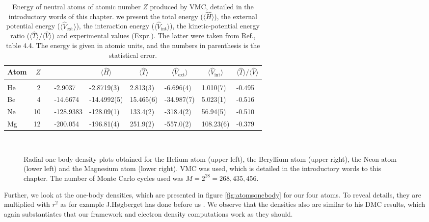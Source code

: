 \begin{table}
	\caption{Energy of neutral atoms of atomic number $Z$ produced by VMC, detailed in the introductory words of this chapter. we present the total energy ($\langle\hat{H}\rangle$), the external potential energy ($\langle\hat{V}_{\text{ext}}\rangle$), the interaction energy ($\langle\hat{V}_{\text{int}}\rangle$), the kinetic-potential energy ratio ($\langle\hat{T}\rangle/\langle\hat{V}\rangle$) and experimental values (Expr.). The latter were taken from Ref.\cite{degroote_faddeev_2013}, table 4.4. The energy is given in atomic units, and the numbers in parenthesis is the statistical error.}
	\label{tab:atomswinteraction}
	\begin{tabularx}{\textwidth}{lrrR{2cm}R{1.9cm}:R{1.8cm}R{1.8cm}R{1.8cm}R{1.7cm}} \hline\hline
		Atom & $Z$ & \makecell{\\ \phantom{=}} & 
		 &  &  &  &  &  \\ \hline \\
		
		He & 2 && -2.9037 & -2.8719(3) & 2.813(3) & -6.696(4) & 1.010(7) & -0.495 \\
		Be & 4 && -14.6674 & -14.4992(5) & 15.465(6) & -34.987(7) & 5.023(1) & -0.516 \\
		Ne & 10 && -128.9383 & -128.09(1) & 133.4(2) & -318.4(2) & 56.94(5) & -0.510 \\ 
		Mg & 12 && -200.054 & -196.81(4) & 251.9(2) & -557.0(2) & 108.23(6) & -0.379 \\ \hline\hline
	\end{tabularx}
\end{table}
\begin{figure}
	\centering
	\captionsetup[subfigure]{labelformat=empty}
	\\
	\caption{Radial one-body density plots obtained for the Helium atom (upper left), the Beryllium atom (upper right), the Neon atom (lower left) and the Magnesium atom (lower right). VMC was used, which is detailed in the introductory words to this chapter. The number of Monte Carlo cycles used was $M=2^{28}=268,435,456$.}
	\label{fig:atomsonebody}
\end{figure}
Further, we look at the one-body densities, which are presented in figure \eqref{fig:atomsonebody} for our four atoms. To reveal details, they are multiplied with $r^2$ as for example J.Høgberget has done before us \cite{hogberget_quantum_2013}. We observe that the densities also are similar to his DMC results, which again substantiates that our framework and electron density computations work as they should. 
